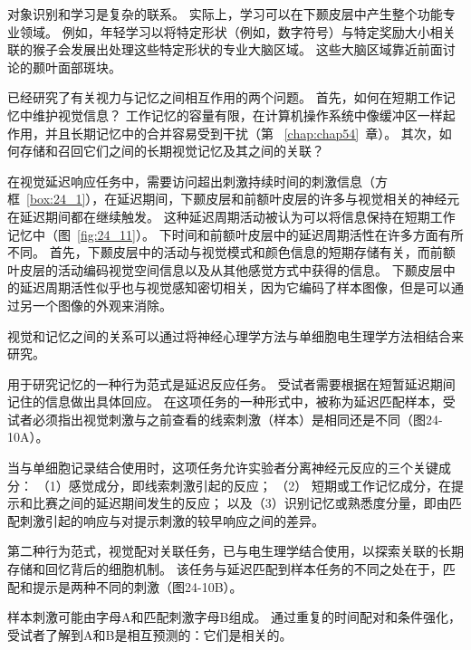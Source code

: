 对象识别和学习是复杂的联系。
实际上，学习可以在下颞皮层中产生整个功能专业领域。 
例如，年轻学习以将特定形状（例如，数字符号）与特定奖励大小相关联的猴子会发展出处理这些特定形状的专业大脑区域。
这些大脑区域靠近前面讨论的颞叶面部斑块。


已经研究了有关视力与记忆之间相互作用的两个问题。
首先，如何在短期工作记忆中维护视觉信息？
工作记忆的容量有限，在计算机操作系统中像缓冲区一样起作用，并且长期记忆中的合并容易受到干扰（第 ~\ref{chap:chap54}~章）。
其次，如何存储和召回它们之间的长期视觉记忆及其之间的关联？


在视觉延迟响应任务中，需要访问超出刺激持续时间的刺激信息（方框~\ref{box:24_1}），在延迟期间，下颞皮层和前额叶皮层的许多与视觉相关的神经元在延迟期间都在继续触发。
这种延迟周期活动被认为可以将信息保持在短期工作记忆中（图~\ref{fig:24_11}）。
下时间和前额叶皮层中的延迟周期活性在许多方面有所不同。
首先，下颞皮层中的活动与视觉模式和颜色信息的短期存储有关，而前额叶皮层的活动编码视觉空间信息以及从其他感觉方式中获得的信息。
下颞皮层中的延迟周期活性似乎也与视觉感知密切相关，因为它编码了样本图像，但是可以通过另一个图像的外观来消除。


\begin{proposition}[视觉与工作记忆的相互作用研究] \label{box:24_1}
	
	\quad \quad 视觉和记忆之间的关系可以通过将神经心理学方法与单细胞电生理学方法相结合来研究。
	
	\quad \quad 用于研究记忆的一种行为范式是延迟反应任务。
	受试者需要根据在短暂延迟期间记住的信息做出具体回应。
	在这项任务的一种形式中，被称为延迟匹配样本，受试者必须指出视觉刺激与之前查看的线索刺激（样本）是相同还是不同（图24-10A）。
	
	\quad \quad 当与单细胞记录结合使用时，这项任务允许实验者分离神经元反应的三个关键成分：
	（1）感觉成分，即线索刺激引起的反应；
	（2） 短期或工作记忆成分，在提示和比赛之间的延迟期间发生的反应；
	以及（3）识别记忆或熟悉度分量，即由匹配刺激引起的响应与对提示刺激的较早响应之间的差异。
	
	\quad \quad 第二种行为范式，视觉配对关联任务，已与电生理学结合使用，以探索关联的长期存储和回忆背后的细胞机制。
	该任务与延迟匹配到样本任务的不同之处在于，匹配和提示是两种不同的刺激（图24-10B）。
	
	\quad \quad 样本刺激可能由字母A和匹配刺激字母B组成。
	通过重复的时间配对和条件强化，受试者了解到A和B是相互预测的：它们是相关的。
	
\end{proposition}


